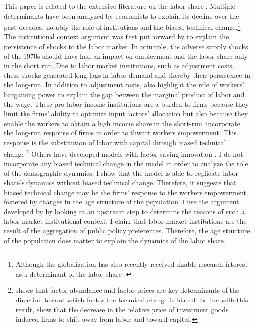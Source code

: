 \documentclass[
]{article}
\begin{document}
This paper is related to the extensive literature on the labor share \citep[see, for example,][]{Blanchard1997, Caballero1998, Acemoglu2003, Karabarbounis2014, Autor2019}. Multiple determinants have been analyzed by economists to explain its decline over the past decades, notably the role of institutions and the biased technical change.\footnote{Although the globalization has also recently received sizable research interest as a determinant of the labor share \citetext{\citealp[see, for example,][]{Jayadev2007}; \citealp{Pica2010}; \citealp{Young2018}; \citealp[and][]{Autor2019}}.}
The institutional context argument was first put forward by \citet{Blanchard1997} to explain the persistence of shocks to the labor market. In principle, the adverse supply shocks of the 1970s should have had an impact on employment and the labor share only in the short run. Due to labor market institutions, such as adjustment costs, these shocks generated long lags in labor demand and thereby their persistence in the long-run.
In addition to adjustment costs, \citet{Bentolila2003} also highlight the role of workers' bargaining power to explain the gap between the marginal product of labor and the wage.
These pro-labor income institutions are a burden to firms because they limit the firms' ability to optimize input factors' allocation but also because they enable the workers to obtain a high income share in the short-run. \citet{Caballero1998} incorporate the long-run response of firms in order to thwart workers empowerment. This response is the substitution of labor with capital through biased technical change.\footnote{\citet{Acemoglu2002} shows that factor abundance and factor prices are key determinants of the direction toward which factor the technical change is biased. In line with this result, \citet{Karabarbounis2014} show that the decrease in the relative price of investment goods induced firms to shift away from labor and toward capital.}
Others have developed models with factor-saving innovation \citep[see, for example,][]{Zuleta2008, Peretto2013}.
I do not incorporate any biased technical change in the model in order to analyze the role of the demographic dynamics. I show that the model is able to replicate labor share's dynamics without biased technical change. Therefore, it suggests that biased technical change may be the firms' response to the workers empowerment fostered by changes in the age structure of the population. I use the argument developed by \citet{Caballero1998} by looking at an upstream step to determine the reasons of such a labor market institutional context. I claim that labor market institutions are the result of the aggregation of public policy preferences. Therefore, the age structure of the population does matter to explain the dynamics of the labor share.
\end{document}
